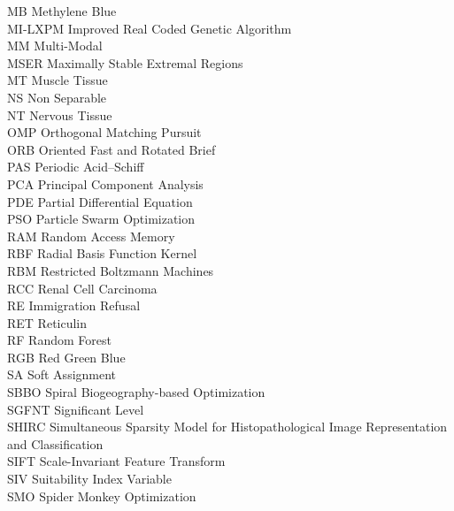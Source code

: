 \begin{nomenclature}
\begin{tabbing}
MB	\> \quad \quad\quad	Methylene Blue	\\
MI-LXPM	\> \quad \quad\quad	Improved Real Coded Genetic Algorithm	\\
MM	\> \quad \quad\quad	Multi-Modal	\\
MSER	\> \quad \quad\quad	Maximally Stable Extremal Regions	\\
MT	\> \quad \quad\quad	Muscle Tissue	\\
NS	\> \quad \quad\quad	Non Separable	\\
NT	\> \quad \quad\quad	Nervous Tissue	\\
OMP	\> \quad \quad\quad	Orthogonal Matching Pursuit	\\
ORB	\> \quad \quad\quad	Oriented Fast and Rotated Brief 	\\
PAS	\> \quad \quad\quad	Periodic Acid–Schiff	\\
PCA	\> \quad \quad\quad	Principal Component Analysis	\\
PDE	\> \quad \quad\quad	Partial Differential Equation	\\
PSO	\> \quad \quad\quad	Particle Swarm Optimization	\\
RAM	\> \quad \quad\quad	Random Access Memory	\\
RBF	\> \quad \quad\quad	Radial Basis Function Kernel	\\
RBM	\> \quad \quad\quad	Restricted Boltzmann Machines	\\
RCC	\> \quad \quad\quad	Renal Cell Carcinoma	\\
RE	\> \quad \quad\quad	Immigration Refusal	\\
RET	\> \quad \quad\quad	Reticulin	\\
RF	\> \quad \quad\quad	Random Forest	\\
RGB	\> \quad \quad\quad	Red Green Blue	\\
SA	\> \quad \quad\quad	Soft Assignment	\\
SBBO	\> \quad \quad\quad	Spiral Biogeography-based Optimization	\\
SGFNT	\> \quad \quad\quad	Significant Level	\\
SHIRC	\> \quad \quad\quad	Simultaneous Sparsity Model for Histopathological Image Representation and Classification	\\
SIFT	\> \quad \quad\quad	Scale-Invariant Feature Transform	\\
SIV	\> \quad \quad\quad	Suitability Index Variable	\\
SMO	\> \quad \quad\quad	Spider Monkey Optimization	\\

\end{tabbing}
\end{nomenclature}
